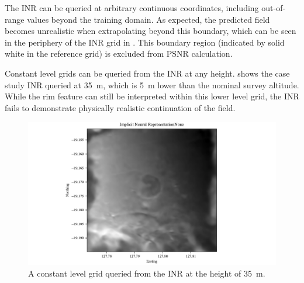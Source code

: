 The INR can be queried at arbitrary continuous coordinates, including out-of-range values beyond the training domain.
As expected, the predicted field becomes unrealistic when extrapolating beyond this boundary, which can be seen in the periphery of the INR grid in .
This boundary region (indicated by solid white in the reference grid) is excluded from PSNR calculation.

Constant level grids can be queried from the INR at any height.
 shows the case study INR queried at \qty{35}{\m}, which is \qty{5}{\m} lower than the nominal survey altitude.
While the rim feature can still be interpreted within this lower level grid, the INR fails to demonstrate physically realistic continuation of the field.

\begin{figure}[hbtp]
    \centering
    \includegraphics[width=1.0\linewidth]{fig/p3/35_level_grid.pdf}
    \caption[Grid prediction outside the nominal altitude]{A constant level grid queried from the INR at the height of \qty{35}{\m}.}
    \label{fig:grid35}
\end{figure}




